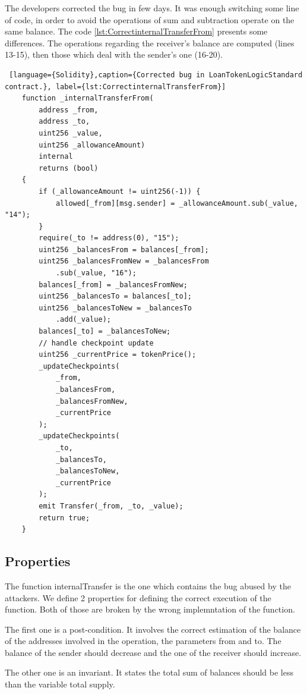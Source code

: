 The developers corrected the bug in few days. 
It was enough switching some line of code, in order to avoid the operations of sum and subtraction operate on the same balance. 
The code \autoref{lst:CorrectinternalTransferFrom} presents some differences. The operations regarding the receiver's balance are computed (lines 13-15), then those which deal with the sender's one (16-20).
\begin{lstlisting} [language={Solidity},caption={Corrected bug in LoanTokenLogicStandard contract.}, label={lst:CorrectinternalTransferFrom}]
    function _internalTransferFrom(
        address _from,
        address _to,
        uint256 _value,
        uint256 _allowanceAmount)
        internal
        returns (bool)
    {
        if (_allowanceAmount != uint256(-1)) {
            allowed[_from][msg.sender] = _allowanceAmount.sub(_value, "14");
        }
        require(_to != address(0), "15");
        uint256 _balancesFrom = balances[_from];
        uint256 _balancesFromNew = _balancesFrom
            .sub(_value, "16");
        balances[_from] = _balancesFromNew;
        uint256 _balancesTo = balances[_to];
        uint256 _balancesToNew = _balancesTo
            .add(_value);
        balances[_to] = _balancesToNew;
        // handle checkpoint update
        uint256 _currentPrice = tokenPrice();
        _updateCheckpoints(
            _from,
            _balancesFrom,
            _balancesFromNew,
            _currentPrice
        );
        _updateCheckpoints(
            _to,
            _balancesTo,
            _balancesToNew,
            _currentPrice
        );
        emit Transfer(_from, _to, _value);
        return true;
    }   
\end{lstlisting}

\subsection{Properties}
The function internalTransfer is the one which contains the bug abused by the attackers. 
We define 2 properties for defining the correct execution of the function. Both of those are broken by 
the wrong implemntation of the function.

The first one is a post-condition. It involves the correct estimation of the balance of the addresses involved in the operation, the parameters from and to.
The balance of the sender should decrease and the one of the receiver should increase.

The other one is an invariant. It states the total sum of balances should be less than the variable total supply. 

